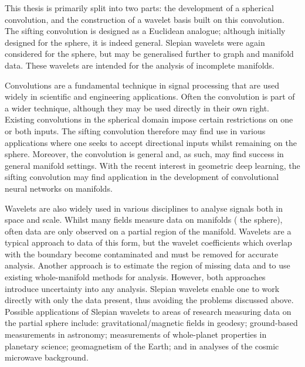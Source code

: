 \begin{impactstatement} %
	This thesis is primarily split into two parts: the development of a spherical convolution, and the construction of a wavelet basis built on this convolution.
	The sifting convolution is designed as a Euclidean analogue; although initially designed for the sphere, it is indeed general.
	Slepian wavelets were again considered for the sphere, but may be generalised further to graph and manifold data.
	These wavelets are intended for the analysis of incomplete manifolds.

	Convolutions are a fundamental technique in signal processing that are used widely in scientific and engineering applications.
	Often the convolution is part of a wider technique, although they may be used directly in their own right.
	Existing convolutions in the spherical domain impose certain restrictions on one or both inputs.
	The sifting convolution therefore may find use in various applications where one seeks to accept directional inputs whilst remaining on the sphere.
	Moreover, the convolution is general and, as such, may find success in general manifold settings.
	With the recent interest in geometric deep learning, the sifting convolution may find application in the development of convolutional neural networks on manifolds.

	Wavelets are also widely used in various disciplines to analyse signals both in space and scale.
	Whilst many fields measure data on manifolds (\ie{} the sphere), often data are only observed on a partial region of the manifold.
	Wavelets are a typical approach to data of this form, but the wavelet coefficients which overlap with the boundary become contaminated and must be removed for accurate analysis.
	Another approach is to estimate the region of missing data and to use existing whole-manifold methods for analysis.
	However, both approaches introduce uncertainty into any analysis.
	Slepian wavelets enable one to work directly with only the data present, thus avoiding the problems discussed above.
	Possible applications of Slepian wavelets to areas of research measuring data on the partial sphere include: gravitational/magnetic fields in geodesy; ground-based measurements in astronomy; measurements of whole-planet properties in planetary science; geomagnetism of the Earth; and in analyses of the cosmic microwave background.
\end{impactstatement}

